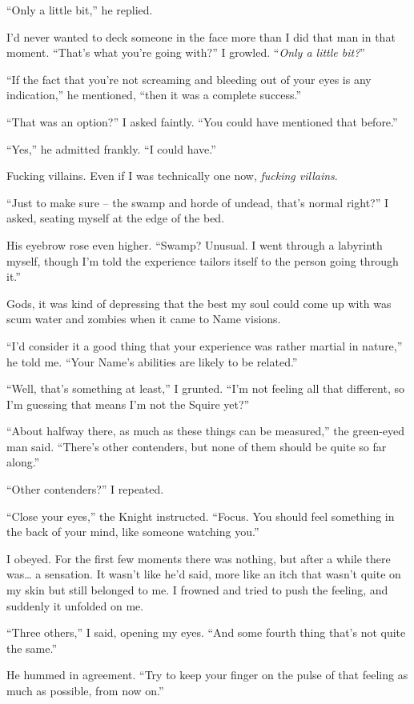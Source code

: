 \documentclass[12pt, openany]{book}
\begin{document}
“Only a little bit,” he replied.

I’d never wanted to deck someone in the face more than I did that man in that moment. “That’s what you’re going with?” I growled. “\textit{Only a little bit?}”

“If the fact that you’re not screaming and bleeding out of your eyes is any indication,” he mentioned, “then it was a complete success.”

“That was an option?” I asked faintly. “You could have mentioned that before.”

“Yes,” he admitted frankly. “I could have.”

Fucking villains. Even if I was technically one now, \textit{fucking villains}.

“Just to make sure – the swamp and horde of undead, that’s normal right?” I asked, seating myself at the edge of the bed.

His eyebrow rose even higher. “Swamp? Unusual. I went through a labyrinth myself, though I’m told the experience tailors itself to the person going through it.”

Gods, it was kind of depressing that the best my soul could come up with was scum water and zombies when it came to Name visions. 

“I’d consider it a good thing that your experience was rather martial in nature,” he told me. “Your Name’s abilities are likely to be related.”

“Well, that’s something at least,” I grunted. “I’m not feeling all that different, so I’m guessing that means I’m not the Squire yet?”

“About halfway there, as much as these things can be measured,” the green-eyed man said. “There’s other contenders, but none of them should be quite so far along.”

“Other contenders?” I repeated.

“Close your eyes,” the Knight instructed. “Focus. You should feel something in the back of your mind, like someone watching you.”

I obeyed. For the first few moments there was nothing, but after a while there was… a sensation. It wasn’t like he’d said, more like an itch that wasn’t quite on my skin but still belonged to me. I frowned and tried to push the feeling, and suddenly it unfolded on me.

“Three others,” I said, opening my eyes. “And some fourth thing that’s not quite the same.”

He hummed in agreement. “Try to keep your finger on the pulse of that feeling as much as possible, from now on.”
\end{document}
